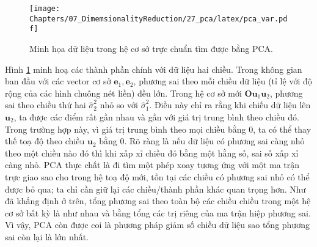 \begin{figure}[ht]
	\centering
\texttt{[image: Chapters/07\_DimemsionalityReduction/27\_pca/latex/pca\_var.pdf]}
\label{hinh4}
\caption{Minh họa dữ liệu trong hệ cơ sở trực chuẩn tìm được bằng PCA.}
\end{figure}

Hình \ref{hinh4} minh hoạ các thành phần chính với dữ liệu hai chiều.
Trong không gian ban đầu với các vector cơ sở $\mathbf{e}_1,
\mathbf{e}_2$, phương sai theo mỗi chiều dữ liệu (tỉ lệ với độ rộng của các hình chuông
nét liền) đều lớn. Trong hệ cơ sở mới $\mathbf{O}\mathbf{u}_1\mathbf{u}_2$,
phương sai theo chiều thứ hai $\hat{\sigma}_2^2$ nhỏ so với
$\hat{\sigma}_1^2$. Điều này chỉ ra rằng khi chiếu dữ liệu lên $\mathbf{u}_2$, ta
được các điểm rất gần nhau và gần với giá trị trung bình theo chiều đó. Trong
trường hợp này, vì giá trị trung bình theo mọi chiều bằng 0, ta có thể thay thế
toạ độ theo chiều $\mathbf{u}_2$ bằng 0. Rõ ràng là nếu dữ liệu có phương sai
càng nhỏ theo một chiều nào đó thì khi xấp xỉ chiều đó bằng một hằng số, sai số
xấp xỉ càng nhỏ. PCA thực chất là đi tìm một phép xoay tương ứng với một ma trận
trực giao sao cho trong hệ toạ độ mới, tồn tại các chiều có phương sai nhỏ
có thể được bỏ qua; ta chỉ cần giữ lại các chiều/thành phần khác quan trọng hơn. Như
đã khẳng định ở trên, tổng phương sai theo toàn bộ các chiều chiều trong một hệ cơ sở bất kỳ là
như nhau và bằng tổng các trị riêng của ma trận hiệp phương sai. Vì vậy, PCA còn
được coi là phương pháp giảm số chiều dữ liệu sao tổng phương sai còn lại là lớn
nhất.
